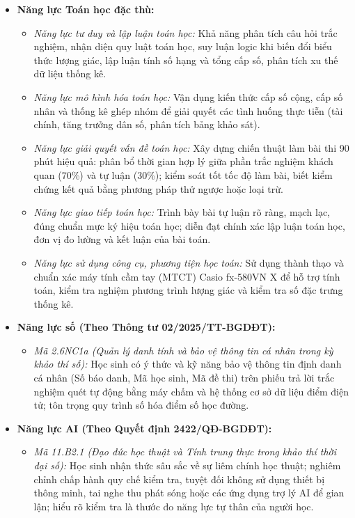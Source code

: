 \documentclass[12pt, a4paper]{article}
\begin{document}
\begin{itemize}[leftmargin=1.2cm]
    \item \textbf{Năng lực Toán học đặc thù:}
    \begin{itemize}[leftmargin=0.6cm]
        \item \textit{Năng lực tư duy và lập luận toán học:} Khả năng phân tích câu hỏi trắc nghiệm, nhận diện quy luật toán học, suy luận logic khi biến đổi biểu thức lượng giác, lập luận tính số hạng và tổng cấp số, phân tích xu thế dữ liệu thống kê.
        \item \textit{Năng lực mô hình hóa toán học:} Vận dụng kiến thức cấp số cộng, cấp số nhân và thống kê ghép nhóm để giải quyết các tình huống thực tiễn (tài chính, tăng trưởng dân số, phân tích bảng khảo sát).
        \item \textit{Năng lực giải quyết vấn đề toán học:} Xây dựng chiến thuật làm bài thi 90 phút hiệu quả: phân bổ thời gian hợp lý giữa phần trắc nghiệm khách quan (70\%) và tự luận (30\%); kiểm soát tốt tốc độ làm bài, biết kiểm chứng kết quả bằng phương pháp thử ngược hoặc loại trừ.
        \item \textit{Năng lực giao tiếp toán học:} Trình bày bài tự luận rõ ràng, mạch lạc, đúng chuẩn mực ký hiệu toán học; diễn đạt chính xác lập luận toán học, đơn vị đo lường và kết luận của bài toán.
        \item \textit{Năng lực sử dụng công cụ, phương tiện học toán:} Sử dụng thành thạo và chuẩn xác máy tính cầm tay (MTCT) Casio fx-580VN X để hỗ trợ tính toán, kiểm tra nghiệm phương trình lượng giác và kiểm tra số đặc trưng thống kê.
    \end{itemize}

    \item \textbf{Năng lực số (Theo Thông tư 02/2025/TT-BGDĐT):}
    \begin{itemize}[leftmargin=0.6cm]
        \item \textit{Mã 2.6NC1a (Quản lý danh tính và bảo vệ thông tin cá nhân trong kỳ khảo thí số):} Học sinh có ý thức và kỹ năng bảo vệ thông tin định danh cá nhân (Số báo danh, Mã học sinh, Mã đề thi) trên phiếu trả lời trắc nghiệm quét tự động bằng máy chấm và hệ thống cơ sở dữ liệu điểm điện tử; tôn trọng quy trình số hóa điểm số học đường.
    \end{itemize}

    \item \textbf{Năng lực AI (Theo Quyết định 2422/QĐ-BGDĐT):}
    \begin{itemize}[leftmargin=0.6cm]
        \item \textit{Mã 11.B2.1 (Đạo đức học thuật và Tính trung thực trong khảo thí thời đại số):} Học sinh nhận thức sâu sắc về sự liêm chính học thuật; nghiêm chỉnh chấp hành quy chế kiểm tra, tuyệt đối không sử dụng thiết bị thông minh, tai nghe thu phát sóng hoặc các ứng dụng trợ lý AI để gian lận; hiểu rõ kiểm tra là thước đo năng lực tự thân của người học.
    \end{itemize}


\end{itemize}
\end{document}
